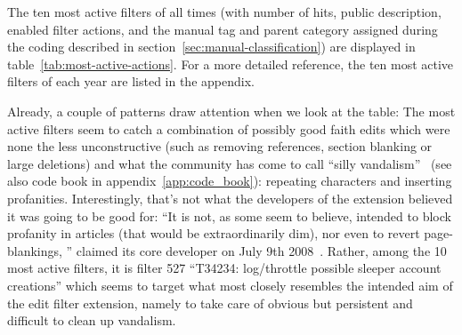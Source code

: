 The ten most active filters of all times (with number of hits, public description, enabled filter actions, and the manual tag and parent category assigned during the coding described in section~\ref{sec:manual-classification}) are displayed in table~\ref{tab:most-active-actions}.
For a more detailed reference, the ten most active filters of each year are listed in the appendix. %

Already, a couple of patterns draw attention when we look at the table:
The most active filters seem to catch a combination of possibly good faith edits which were none the less unconstructive (such as removing references, section blanking or large deletions)
and what the community has come to call ``silly vandalism''~\cite{Wikipedia:VandalismTypes} (see also code book in appendix~\ref{app:code_book}): repeating characters and inserting profanities.
Interestingly, that's not what the developers of the extension believed it was going to be good for:
``It is not, as some seem to believe, intended to block profanity in articles (that would be extraordinarily dim), nor even to revert page-blankings, '' claimed its core developer on July 9th 2008~\cite{Wikipedia:EditFilterTalkArchive1Clarification}.
Rather, among the 10 most active filters, it is filter 527 ``T34234: log/throttle possible sleeper account creations'' which seems to target what most closely resembles the intended aim of the edit filter extension, namely to take care of obvious but persistent and difficult to clean up vandalism.

